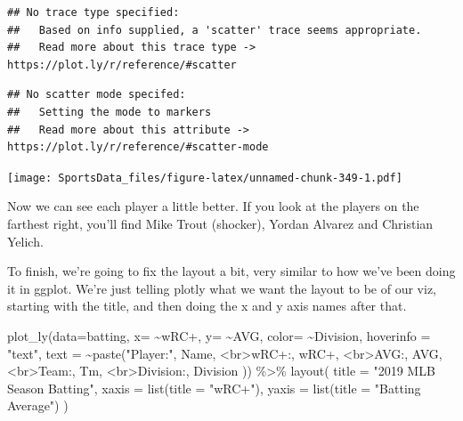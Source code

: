 \documentclass[
]{book}
\newenvironment{Shaded}{\begin{snugshade}}{\end{snugshade}}
\newcommand{\AttributeTok}[1]{\textcolor[rgb]{0.77,0.63,0.00}{#1}}
\newcommand{\FunctionTok}[1]{\textcolor[rgb]{0.00,0.00,0.00}{#1}}
\newcommand{\NormalTok}[1]{#1}
\newcommand{\SpecialCharTok}[1]{\textcolor[rgb]{0.00,0.00,0.00}{#1}}
\newcommand{\StringTok}[1]{\textcolor[rgb]{0.31,0.60,0.02}{#1}}
\begin{document}
\begin{verbatim}
## No trace type specified:
##   Based on info supplied, a 'scatter' trace seems appropriate.
##   Read more about this trace type -> https://plot.ly/r/reference/#scatter
\end{verbatim}

\begin{verbatim}
## No scatter mode specifed:
##   Setting the mode to markers
##   Read more about this attribute -> https://plot.ly/r/reference/#scatter-mode
\end{verbatim}

\texttt{[image: SportsData\_files/figure-latex/unnamed-chunk-349-1.pdf]}

Now we can see each player a little better. If you look at the players on the farthest right, you'll find Mike Trout (shocker), Yordan Alvarez and Christian Yelich.

To finish, we're going to fix the layout a bit, very similar to how we've been doing it in ggplot. We're just telling plotly what we want the layout to be of our viz, starting with the title, and then doing the x and y axis names after that.

\begin{Shaded}
\begin{Highlighting}[]
\FunctionTok{plot\_ly}\NormalTok{(}\AttributeTok{data=}\NormalTok{batting, }\AttributeTok{x=} \SpecialCharTok{\textasciitilde{}}\StringTok{\textasciigrave{}}\AttributeTok{wRC+}\StringTok{\textasciigrave{}}\NormalTok{, }\AttributeTok{y=} \SpecialCharTok{\textasciitilde{}}\StringTok{\textasciigrave{}}\AttributeTok{AVG}\StringTok{\textasciigrave{}}\NormalTok{, }\AttributeTok{color=} \SpecialCharTok{\textasciitilde{}}\StringTok{\textasciigrave{}}\AttributeTok{Division}\StringTok{\textasciigrave{}}\NormalTok{,}
        \AttributeTok{hoverinfo =} \StringTok{"text"}\NormalTok{,}
        \AttributeTok{text =} \SpecialCharTok{\textasciitilde{}}\FunctionTok{paste}\NormalTok{(}\StringTok{"Player:"}\NormalTok{, Name,}
                      \StringTok{\textquotesingle{}\textless{}br\textgreater{}wRC+:\textquotesingle{}}\NormalTok{, }\StringTok{\textasciigrave{}}\AttributeTok{wRC+}\StringTok{\textasciigrave{}}\NormalTok{,}
                      \StringTok{\textquotesingle{}\textless{}br\textgreater{}AVG:\textquotesingle{}}\NormalTok{, AVG,}
                      \StringTok{\textquotesingle{}\textless{}br\textgreater{}Team:\textquotesingle{}}\NormalTok{, Tm,}
                      \StringTok{\textquotesingle{}\textless{}br\textgreater{}Division:\textquotesingle{}}\NormalTok{, Division}
\NormalTok{                      )) }\SpecialCharTok{\%\textgreater{}\%} 
  \FunctionTok{layout}\NormalTok{(}
    \AttributeTok{title =} \StringTok{"2019 MLB Season Batting"}\NormalTok{,}
    \AttributeTok{xaxis =} \FunctionTok{list}\NormalTok{(}\AttributeTok{title =} \StringTok{"wRC+"}\NormalTok{),}
    \AttributeTok{yaxis =} \FunctionTok{list}\NormalTok{(}\AttributeTok{title =} \StringTok{"Batting Average"}\NormalTok{)}
\NormalTok{  )}
\end{Highlighting}
\end{Shaded}
\end{document}

